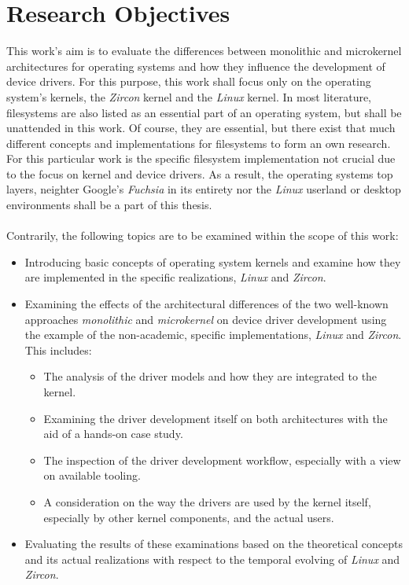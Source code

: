 \section{Research Objectives}\label{sec:research-objectives}
This work's aim is to evaluate the differences between monolithic and microkernel architectures for operating systems and how they influence the development of device drivers.
For this purpose, this work shall focus only on the operating system's kernels, the \textit{Zircon} kernel and the \textit{Linux} kernel.
In most literature, filesystems are also listed as an essential part of an operating system, but shall be unattended in this work.
Of course, they are essential, but there exist that much different concepts and implementations for filesystems to form an own research.
For this particular work is the specific filesystem implementation not crucial due to the focus on kernel and device drivers.
As a result, the operating systems top layers, neighter Google's \textit{Fuchsia} in its entirety nor the \textit{Linux} userland or desktop environments shall be a part of this thesis.\\
\\
Contrarily, the following topics are to be examined within the scope of this work:
\begin{itemize}
    \item Introducing basic concepts of operating system kernels and examine how they are implemented in the specific realizations, \textit{Linux} and \textit{Zircon}.
    \item Examining the effects of the architectural differences of the two well-known approaches \textit{monolithic} and \textit{microkernel} on device driver development using the example of the non-academic, specific implementations, \textit{Linux} and \textit{Zircon}. This includes:  
        \begin{itemize}
            \item The analysis of the driver models and how they are integrated to the kernel.
            \item Examining the driver development itself on both architectures with the aid of a hands-on case study.
            \item The inspection of the driver development workflow, especially with a view on available tooling. 
            \item A consideration on the way the drivers are used by the kernel itself, especially by other kernel components, and the actual users.
        \end{itemize}
    \item Evaluating the results of these examinations based on the theoretical concepts and its actual realizations with respect to the temporal evolving of \textit{Linux} and \textit{Zircon}.
\end{itemize}

